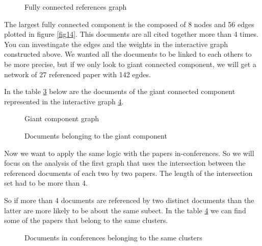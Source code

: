 \documentclass[article,twocolumn]{IEEEtran}
\begin{document}
    \begin{figure}
        \begin{center}\end{center}
        \caption{Fully connected references graph}
        \label{fig12}
    \end{figure}
    
    The largest fully connected component is the composed of 8 nodes and 56
edges plotted in figure \ref{fig14}. This documents are all cited
together more than 4 times. You can investingate the edges and the
weights in the interactive graph constructed above. We wanted all the
documents to be linked to each others to be more precise, but if we only
look to giant connected component, we will get a network of 27
referenced paper with 142 egdes.


    In the table \ref{fig10} below are the documents of the giant connected
component represented in the interactive graph \ref{fig11}.


    \begin{figure}
        \begin{center}\end{center}
        \caption{Giant component graph}
        \label{fig12}
    \end{figure}
    

    \begin{figure}
        \begin{center}\end{center}
        \caption{Documents belonging to the giant component}
        \label{fig10}
    \end{figure}
    
    Now we want to apply the same logic with the papers in-conferences. So
we will focus on the analysis of the first graph that uses the
intersection between the referenced documents of each two by two papers.
The length of the intersection set had to be more than 4.

So if more than 4 documents are referenced by two distinct documents
than the latter are more likely to be about the same subect. In the
table \ref{fig11} we can find some of the papers that belong to the same
clusters.


    \begin{figure}
        \begin{center}\end{center}
        \caption{Documents in conferences belonging to the same clusters}
        \label{fig11}
    \end{figure}
    
\end{document}
